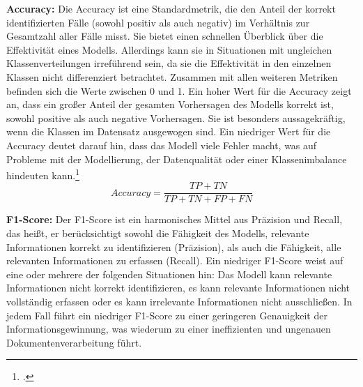 \textbf{Accuracy:} Die Accuracy ist eine Standardmetrik, die den Anteil der korrekt identifizierten Fälle (sowohl positiv als auch negativ) im Verhältnis zur Gesamtzahl aller Fälle misst. Sie bietet einen schnellen Überblick über die Effektivität eines Modells. Allerdings kann sie in Situationen mit ungleichen Klassenverteilungen irreführend sein, da sie die Effektivität in den einzelnen Klassen nicht differenziert betrachtet. Zusammen mit allen weiteren Metriken befinden sich die Werte zwischen 0 und 1. Ein hoher Wert für die Accuracy zeigt an, dass ein großer Anteil der gesamten Vorhersagen des Modells korrekt ist, sowohl positive als auch negative Vorhersagen. Sie ist besonders aussagekräftig, wenn die Klassen im Datensatz ausgewogen sind.
Ein niedriger Wert für die Accuracy deutet darauf hin, dass das Modell viele Fehler macht, was auf Probleme mit der Modellierung, der Datenqualität oder einer Klassenimbalance hindeuten kann.\footcites[Vgl.][S. 508]{naser_error_2023}
\begin{equation}
    {Accuracy} = \frac{TP + TN}{TP + TN + FP + FN} 
\end{equation}


\textbf{F1-Score:} Der F1-Score ist ein harmonisches Mittel aus Präzision und Recall, das heißt, er berücksichtigt sowohl die Fähigkeit des Modells, relevante Informationen korrekt zu identifizieren (Präzision), als auch die Fähigkeit, alle relevanten Informationen zu erfassen (Recall). Ein niedriger F1-Score weist auf eine oder mehrere der folgenden Situationen hin: Das Modell kann relevante Informationen nicht korrekt identifizieren, es kann relevante Informationen nicht vollständig erfassen oder es kann irrelevante Informationen nicht ausschließen. In jedem Fall führt ein niedriger F1-Score zu einer geringeren Genauigkeit der Informationsgewinnung, was wiederum zu einer ineffizienten und ungenauen Dokumentenverarbeitung führt.

